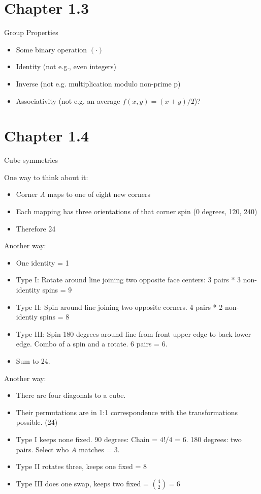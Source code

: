 \documentclass[11pt, oneside]{article}   	%
\begin{document}
\section {Chapter 1.3}

Group Properties

\begin{itemize}
\item Some binary operation $( \cdot )$
\item Identity (not e.g., even integers)
\item Inverse (not e.g. multiplication modulo non-prime p)
\item Associativity (not e.g. an average $f(x,y) = (x+y)/2$)?
\end{itemize}

\section {Chapter 1.4}

Cube symmetries

One way  to think about it: 

\begin{itemize}
\item Corner \emph{A} maps to one of eight new corners
\item Each mapping has three orientations of that corner spin  (0 degrees, 120, 240)
\item Therefore 24
\end{itemize}

Another way:
\begin{itemize}
\item One identity = 1
\item Type I: Rotate around line joining two opposite face centers: 3 pairs * 3 non-identity spins = 9
\item Type II: Spin around line joining two opposite corners.  4 pairs * 2 non-identiy spins = 8
\item Type III: Spin 180 degrees around line from front upper edge to back lower edge.  Combo of a spin and a rotate.  6 pairs = 6.
\item Sum to 24.
\end{itemize}

Another way:
\begin{itemize}
\item There are four diagonals to a cube.
\item Their permutations are in 1:1 correspondence with the transformations possible.   (24)
\item Type I keeps none fixed.  90 degrees: Chain = $4! / 4$ = 6.   180 degrees: two pairs.  Select who $A$ matches = 3.
\item Type II rotates three, keeps one fixed = 8
\item Type III does one swap, keeps two fixed = ${4 \choose 2} = 6$
\end{itemize}
\end{document}
